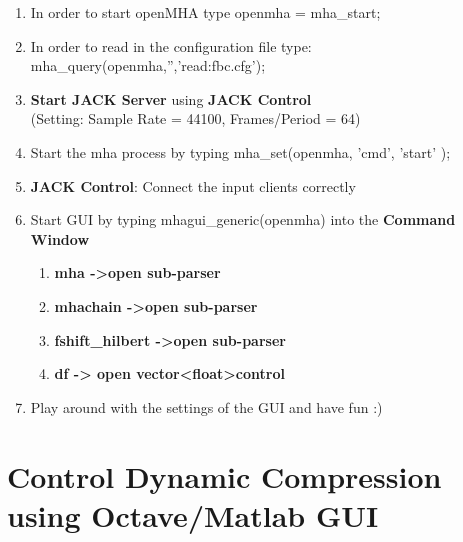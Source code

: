 \documentclass[11pt,a4paper,twoside]{article}
\newcommand{\+}{\discretionary{\mbox{\scriptsize$\hookleftarrow$}}{}{}}
\begin{document}
{{{\begin{enumerate}
\item In order to start openMHA type {\ttfamily openmha = mha\_start;} 
\item In order to read in the configuration file type: \\ {\ttfamily mha\_query(openmha,'','read:fbc.cfg');}
\item \textbf{Start JACK Server} using \textbf{JACK Control}\\ (Setting: Sample Rate = 44100, Frames/Period = 64)
\item Start the mha process by typing {\ttfamily mha\_set(openmha, 'cmd', 'start' );}
\item \textbf{JACK Control}: Connect the input clients correctly
\item Start GUI by typing {\ttfamily mhagui\_generic(openmha)} into the \textbf{Command Window}
\begin{enumerate}
\item \textbf{mha ->open sub-parser}
\item \textbf{mhachain ->open sub-parser}
\item \textbf{fshift\_hilbert ->open sub-parser}
\item \textbf{df -> open vector<float>control}
\end{enumerate}
\item Play around with the settings of the GUI and have fun :)
\end{enumerate}

\newpage

\section{Control Dynamic Compression using Octave/Matlab GUI}


}}}
\end{document}
